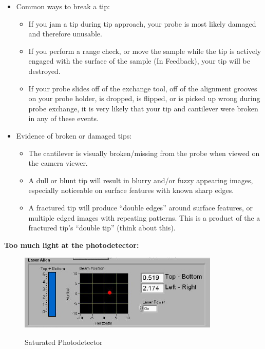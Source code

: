 \documentclass{../lab}
\begin{document}
\begin{itemize}
    \item Common ways to break a tip:

    \begin{itemize}
        \item If you jam a tip during tip approach, your probe is most likely damaged and therefore unusable.

        \item If you perform a range check, or move the sample while the tip is actively engaged with the surface of the sample (In Feedback), your tip will be destroyed.

        \item If your probe slides off of the exchange tool, off of the alignment grooves on your probe holder, is dropped, is flipped, or is picked up wrong during probe exchange, it is very likely that your tip and cantilever were broken in any of these events.

    \end{itemize}

    \item Evidence of broken or damaged tips:

    \begin{itemize}
        \item The cantilever is visually broken/missing from the probe when viewed on the camera viewer.

        \item A dull or blunt tip will result in blurry and/or fuzzy appearing images, especially noticeable on surface features with known sharp edges.

        \item A fractured tip will produce ``double edges'' around surface features, or multiple edged images with repeating patterns.  This is a product of the a fractured tip's ``double tip'' (think about this).

    \end{itemize}

\end{itemize}

\textbf{Too much light at the photodetector:}

\begin{figure}[h]
\centering
    \href{http://experimentationlab.berkeley.edu/sites/default/files/AFMImages/53.png}{\includegraphics[width=0.7\linewidth]{images/53.png}}
    \caption{Saturated Photodetector}
\end{figure}
\end{document}
